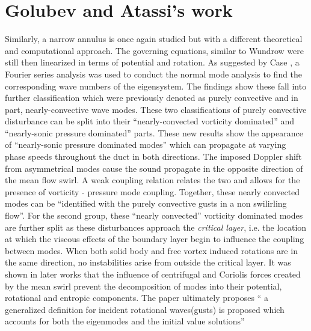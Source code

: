 \section{Golubev and Atassi's work}
Similarly, a narrow annulus is once again 
studied but with a different theoretical and computational approach. The governing equations, similar to Wundrow \cite{Wundrow2019} were still then linearized in terms of potential and rotation. As suggested by Case \cite{Case2004}, a Fourier series analysis was used to conduct the normal mode analysis to find the corresponding wave numbers 
of the eigensystem. The findings show these fall into further classification which were previously denoted as purely convective and 
in part, nearly-convective wave modes. These two classifications of purely convective disturbance can be split into 
their ``nearly-convected vorticity dominated'' and ``nearly-sonic pressure dominated'' parts. These new 
results show the appearance of ``nearly-sonic pressure dominated modes'' which can propagate at varying phase speeds 
throughout the duct in both directions. The imposed Doppler shift from asymmetrical modes cause the sound propagate in the 
opposite direction of the mean flow swirl. A weak coupling relation relates the two and allows for the presence 
of vorticity - pressure mode coupling. Together, these nearly convected modes can be ``identified with the purely 
convective gusts in a non swilirling flow''. For the second group, these ``nearly convected'' vorticity dominated 
modes are further split as these disturbances approach the \textit{critical layer}, i.e. the 
location at which the viscous effects of the boundary layer begin to influence the coupling between modes. When both 
solid body and free vortex induced rotations are in the same direction, no instabilities arise from outside the critical 
layer. It was shown in later works that the influence of centrifugal and Coriolis forces created by the mean 
swirl prevent the decomposition of modes into their potential, rotational and entropic components. The paper ultimately proposes ``
a generalized definition for incident rotational waves(gusts) is proposed which accounts for both the eigenmodes and the 
initial value solutions'' 
